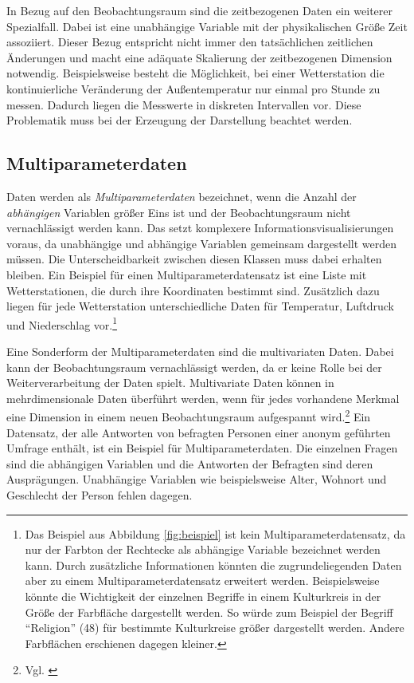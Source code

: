 \documentclass[a4paper, 
               12pt,
               DIV=calc,
               version=first,
               pdftex,
               headsepline,
               footsepline,
               bibliography=totocnumbered,
               listof=numbered]{scrreprt}
\begin{document}
In Bezug auf den Beobachtungsraum sind die zeitbezogenen Daten ein weiterer Spezialfall.
Dabei ist eine unabhängige Variable mit der physikalischen Größe Zeit assoziiert.
Dieser Bezug entspricht nicht immer den tatsächlichen zeitlichen Änderungen und macht
eine adäquate Skalierung der zeitbezogenen Dimension notwendig.
Beispielsweise besteht die Möglichkeit, bei einer Wetterstation die kontinuierliche Veränderung der Außentemperatur
nur einmal pro Stunde zu messen. Dadurch liegen die Messwerte in diskreten Intervallen vor.
Diese Problematik muss bei der Erzeugung der Darstellung beachtet werden.

\subsection{Multiparameterdaten}
Daten werden als \textit{Multiparameterdaten} bezeichnet, wenn die Anzahl der \textit{abhängigen} Variablen größer Eins ist
und der Beobachtungsraum nicht vernachlässigt werden kann. Das setzt komplexere
Informationsvisualisierungen voraus, da unabhängige und abhängige Variablen gemeinsam
dargestellt werden müssen. Die Unterscheidbarkeit zwischen diesen Klassen muss dabei
erhalten bleiben.
Ein Beispiel für einen Multiparameterdatensatz ist eine Liste mit Wetterstationen, die durch ihre
Koordinaten bestimmt sind. Zusätzlich dazu liegen für jede Wetterstation unterschiedliche
Daten für Temperatur, Luftdruck und Niederschlag vor.\footnote{Das Beispiel aus Abbildung
\ref{fig:beispiel} ist kein Multiparameterdatensatz, da nur der Farbton der Rechtecke als
abhängige Variable bezeichnet werden kann. Durch zusätzliche Informationen könnten die
zugrundeliegenden Daten aber zu einem Multiparameterdatensatz erweitert werden. Beispielsweise
könnte die Wichtigkeit der einzelnen Begriffe in einem Kulturkreis in der Größe der
Farbfläche dargestellt werden. So würde zum Beispiel der Begriff "`Religion"' (48) für
bestimmte Kulturkreise größer dargestellt werden. Andere Farbflächen erschienen dagegen
kleiner.}

Eine Sonderform der Multiparameterdaten sind die multivariaten Daten. Dabei kann
der Beobachtungsraum vernachlässigt werden, da er keine Rolle bei der Weiterverarbeitung
der Daten spielt. Multivariate Daten können in mehrdimensionale Daten überführt werden,
wenn für jedes vorhandene Merkmal eine Dimension in einem neuen Beobachtungsraum
aufgespannt wird.\footnote{Vgl. \citep[S.\,172]{Schumann}} Ein Datensatz, der alle
Antworten von befragten Personen einer anonym geführten Umfrage enthält, ist ein Beispiel
für Multiparameterdaten. Die einzelnen Fragen sind die abhängigen Variablen und
die Antworten der Befragten sind deren Ausprägungen. Unabhängige Variablen wie beispielsweise
Alter, Wohnort und Geschlecht der Person fehlen dagegen.
\end{document}
